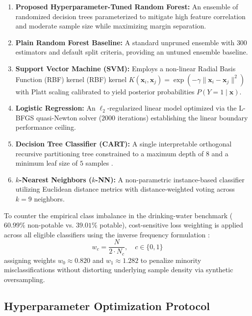 \documentclass[pdflatex,sn-mathphys-num]{sn-jnl}%
\theoremstyle{thmstyleone}%
\theoremstyle{thmstyletwo}%
\theoremstyle{thmstylethree}%
\begin{document}
\begin{enumerate}
    \item \textbf{Proposed Hyperparameter-Tuned Random Forest:} An ensemble of randomized decision trees \cite{breiman2001} parameterized to mitigate high feature correlation and moderate sample size while maximizing margin separation.
    \item \textbf{Plain Random Forest Baseline:} A standard unpruned ensemble with $300$ estimators \cite{breiman2001} and default split criteria, providing an untuned ensemble baseline.
    \item \textbf{Support Vector Machine (SVM):} Employs a non-linear Radial Basis Function (RBF) kernel \cite{cortes1995} (RBF) kernel $K(\mathbf{x}_i, \mathbf{x}_j) = \exp(-\gamma \|\mathbf{x}_i - \mathbf{x}_j\|^2)$ with Platt scaling calibrated to yield posterior probabilities $P(Y=1 \mid \mathbf{x})$.
    \item \textbf{Logistic Regression:} An $\ell_2$-regularized linear model \cite{cox1958} optimized via the L-BFGS quasi-Newton solver \cite{liu1989} ($2000$ iterations) establishing the linear boundary performance ceiling.
    \item \textbf{Decision Tree Classifier (CART):} A single interpretable orthogonal recursive partitioning tree constrained to a maximum depth of $8$ and a minimum leaf size of $5$ samples \cite{breiman1984}.
    \item \textbf{$k$-Nearest Neighbors ($k$-NN):} A non-parametric instance-based classifier \cite{cover1967} utilizing Euclidean distance metrics with distance-weighted voting across $k = 9$ neighbors.
\end{enumerate}

To counter the empirical class imbalance in the drinking-water benchmark ($60.99\%$ non-potable vs. $39.01\%$ potable), cost-sensitive loss weighting is applied across all eligible classifiers using the inverse frequency formulation \cite{he2009}:
\begin{equation}
    w_c = \frac{N}{2 \cdot N_c}, \quad c \in \{0, 1\}
    \label{eq:class_weight}
\end{equation}
assigning weights $w_0 \approx 0.820$ and $w_1 \approx 1.282$ to penalize minority misclassifications without distorting underlying sample density via synthetic oversampling.


\subsection{Hyperparameter Optimization Protocol}\label{subsec4_4}
\end{document}
